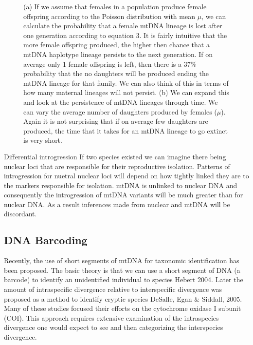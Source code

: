 \documentclass{report}\usepackage[]{graphicx}\usepackage[]{color}
\begin{document}
\begin{figure}[htb]
\begin{subfigure}[b]{.5\linewidth}
    \caption{}\label{fig:chunk-12}
  \end{subfigure}%
  \caption{(a) If we assume that females in a population produce female offspring according to
  the Poisson distribution with mean $\mu$, we can calculate the probability that a female mtDNA
  lineage is lost after one generation according to equation 3. It is fairly intuitive that the more female offspring
  produced, the higher then chance that a mtDNA haplotype lineage persists to the next generation. If on average
  only 1 female offspring is left, then there is a 37\% probability that the no daughters will
  be produced ending the mtDNA lineage for that family. We can also think of this in terms of how many maternal
  lineages will not persist. 
  (b) We can expand this and look at the persistence of mtDNA lineages through time. We can vary the average number
  of daughters produced by females ($\mu$). Again it is not surprising that if on average few daughters are produced, the
  time that it takes for an mtDNA lineage to go extinct is very short.}\label{fig:mtDNA_haplo_loss}
\end{figure}


Differential introgression
If two species existed we can imagine there being nuclear loci that are responsible for their reproductive isolation.
Patterns of introgression for nuetral nuclear loci will depend on how tightly linked they are to the markers 
responsible for isolation. mtDNA is unlinked to nuclear DNA and consequently the introgression of mtDNA variants 
will be much greater than for nuclear DNA. %
As a result inferences made from nuclear and mtDNA will be discordant. 



\subsection*{DNA Barcoding}
Recently, the use of short segments of mtDNA for taxonomic identification has been proposed. 
The basic theory is that we can use a short segment of DNA (a barcode) to identify an unidentified individual 
to species Hebert 2004. Later the amount of intraspecific divergence relative to 
interspecific divergence was proposed as a method
to identify cryptic species DeSalle, Egan \& Siddall, 2005. Many of these studies 
focused their efforts on the cytochrome oxidase I subunit (COI). This  approach 
requires extensive examination of the intraspecies divergence one would expect to see and then 
categorizing the interspecies divergence.
\end{document}

